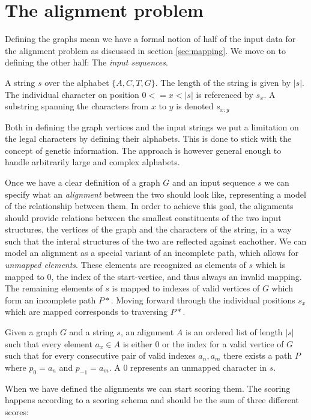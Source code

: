 \documentclass[thesis.tex]{subfiles}
\begin{document}
\section{The alignment problem}
{\parindent0pt
Defining the graphs mean we have a formal notion of half of the input data for the alignment problem as discussed in section \ref{sec:mapping}. We move on to defining the other half: The \textit{input sequences}.
\begin{defn}
  A string $s$ over the alphabet $\{A, C, T, G\}$. The length of the string is given by $|s|$. The individual character on position $0<=x<|s|$ is referenced by $s_x$. A substring spanning the characters from $x$ to $y$ is denoted $s_{x:y}$
\end{defn}
Both in defining the graph vertices and the input strings we put a limitation on the legal characters by defining their alphabets. This is done to stick with the concept of genetic information. The approach is however general enough to handle arbitrarily large and complex alphabets.\\
\par\noindent
Once we have a clear definition of a graph $G$ and an input sequence $s$ we can specify what an \textit{alignment} between the two should look like, representing a model of the relationship between them. In order to achieve this goal, the alignments should provide relations between the smallest constituents of the two input structures, the vertices of the graph and the characters of the string, in a way such that the interal structures of the two are reflected against eachother. We can model an alignment as a special variant of an incomplete path, which allows for \textit{unmapped elements}. These elements are recognized as elements of $s$ which is mapped to $0$, the index of the start-vertice, and thus always an invalid mapping. The remaining elements of $s$ is mapped to indexes of valid vertices of $G$ which form an incomplete path $P*$. Moving forward through the individual positions $s_x$ which are mapped corresponds to traversing $P*$.
\begin{defn}[Alignment]
  Given a graph $G$ and a string $s$, an alignment $A$ is an ordered list of length $|s|$ such that every element $a_x \in A$ is either $0$ or the index for a valid vertice of $G$ such that for every consecutive pair of valid indexes $a_n, a_m$ there exists a path $P$ where $p_0=a_n$ and $p_{-1}=a_m$. A $0$ represents an unmapped character in $s$.
\end{defn}
When we have defined the alignments we can start scoring them. The scoring happens according to a scoring schema and should be the sum of three different scores:
}
\end{document}
